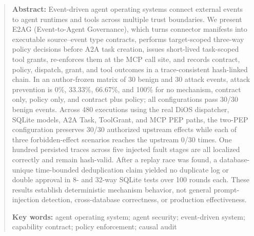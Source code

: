 \documentclass[UTF8,zihao=5,fontset=none]{ctexart}
\begin{document}
\begin{quote}\small
\textbf{Abstract:} Event-driven agent operating systems connect external events to agent runtimes and tools across multiple trust boundaries. We present E2AG (Event-to-Agent Governance), which turns connector manifests into executable source--event type contracts, performs target-scoped three-way policy decisions before A2A task creation, issues short-lived task-scoped tool grants, re-enforces them at the MCP call site, and records contract, policy, dispatch, grant, and tool outcomes in a trace-consistent hash-linked chain. In an author-frozen matrix of 30 benign and 30 attack events, attack prevention is 0\%, 33.33\%, 66.67\%, and 100\% for no mechanism, contract only, policy only, and contract plus policy; all configurations pass 30/30 benign events. Across 480 executions using the real DiOS dispatcher, SQLite models, A2A Task, ToolGrant, and MCP PEP paths, the two-PEP configuration preserves 30/30 authorized upstream effects while each of three forbidden-effect scenarios reaches the upstream 0/30 times. One hundred persisted traces across five injected fault stages are all localized correctly and remain hash-valid. After a replay race was found, a database-unique time-bounded deduplication claim yielded no duplicate log or double approval in 8- and 32-way SQLite tests over 100 rounds each. These results establish deterministic mechanism behavior, not general prompt-injection detection, cross-database correctness, or production effectiveness.

\textbf{Key words:} agent operating system; agent security; event-driven system; capability contract; policy enforcement; causal audit
\end{quote}


\end{document}
